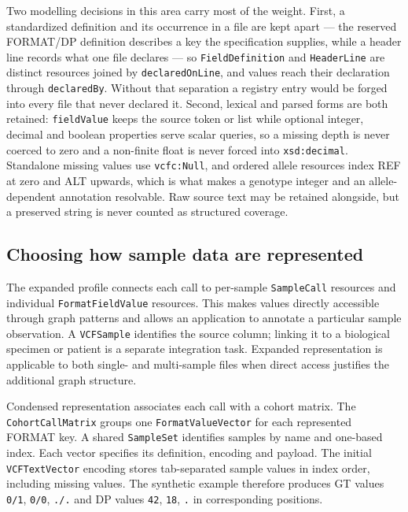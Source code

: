 \documentclass{ceurart}
\newcommand{\term}[1]{\texttt{#1}}
\begin{document}
Two modelling decisions in this area carry most of the weight. 
First, a standardized definition and its occurrence in a file are kept apart --- the reserved FORMAT/DP definition describes a key the specification supplies, while a header line records what one file declares --- so \term{FieldDefinition} and \term{HeaderLine} are distinct resources joined by \term{declaredOnLine}, and values reach their declaration through \term{declaredBy}. 
Without that separation a registry entry would be forged into every file that never declared it. 
Second, lexical and parsed forms are both retained: \term{fieldValue} keeps the source token or list while optional integer, decimal and boolean properties serve scalar queries, so a missing depth is never coerced to zero and a non-finite float is never forced into \term{xsd:decimal}. 
Standalone missing values use \term{vcfc:Null}, and ordered allele resources index REF at zero and ALT upwards, which is what makes a genotype integer and an allele-dependent annotation resolvable. 
Raw source text may be retained alongside, but a preserved string is never counted as structured coverage.

\subsection{Choosing how sample data are represented}
\label{sec:profiles}

The expanded profile connects each call to per-sample \term{SampleCall} resources and individual \term{FormatFieldValue} resources. 
This makes values directly accessible through graph patterns and allows an application to annotate a particular sample observation. 
A \term{VCFSample} identifies the source column; linking it to a biological specimen or patient is a separate integration task. 
Expanded representation is applicable to both single- and multi-sample files when direct access justifies the additional graph structure.

Condensed representation associates each call with a cohort matrix. 
The \term{CohortCallMatrix} groups one \term{FormatValueVector} for each represented FORMAT key. 
A shared \term{SampleSet} identifies samples by name and one-based index. 
Each vector specifies its definition, encoding and payload. 
The initial \term{VCFTextVector} encoding stores tab-separated sample values in index order, including missing values. 
The synthetic example therefore produces GT values \term{0/1}, \term{0/0}, \term{./.} and DP values \term{42}, \term{18}, \term{.} in corresponding positions.
\end{document}
